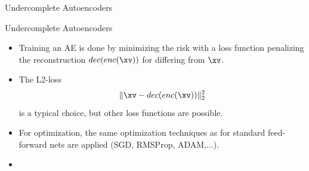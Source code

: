 \begin{frame}{Undercomplete Autoencoders}
  
\end{frame}

\begin{vbframe}{Undercomplete Autoencoders}

  \begin{itemize}
    \item %
    Training an AE is done by minimizing the risk with a loss function penalizing the reconstruction  $dec(enc(\xv))$ for differing from $\xv$. 
    \item The L2-loss 
    $$
    \|\xv - dec(enc(\xv))\|^2_2
    $$
    is a typical choice, but other loss functions are possible. 
    \item For optimization, the same optimization techniques as for standard feed-forward nets are applied (SGD, RMSProp, ADAM,...).
    \item[]
  \end{itemize}

\end{vbframe}


